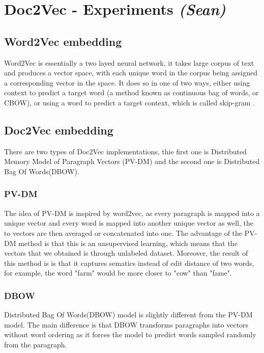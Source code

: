 \documentclass[journal,12pt,onecolumn]{IEEEtran}
\begin{document}
\section{Doc2Vec - Experiments \textit{(Sean)}}


\subsection{Word2Vec embedding}
Word2Vec is essentially a two layed neural network, it takes large corpus of text and produces a vector space, with each unique word in the corpus being assigned a corresponding vector in the space.
It does so in one of two ways, either using context to predict a target word (a method known as continuous bag of words, or CBOW), or using a word to predict a target context, which is called skip-gram \cite{word2vec}.

\subsection{Doc2Vec embedding}
There are two types of Doc2Vec implementations, thie first one is Distributed Memory Model of Paragraph Vectors (PV-DM) and the second one is Distributed Bag Of Words(DBOW)\cite{doc2vec}.
\subsubsection{PV-DM}
The idea of PV-DM is inspired by word2vec, as every paragraph is mapped into a unique vector and every word is mapped into another unique vector as well, the to vectors are then averaged or concatenated into one. The advantage of the PV-DM method is that this is an unsupervised learning, which means that the vectors that we obtained is through unlabeled dataset. Moreover, the result of this method is is that it captures sematics instead of edit distance of two words, for example, the word "farm" would be more closer to "cow" than "fame".
\subsubsection{DBOW}
Distributed Bag Of Words(DBOW) model is slightly different from the PV-DM model. The main difference is that DBOW transforms paragraphs into vectors without word ordering as it forces the model to predict words sampled randomly from the paragraph.
\end{document}
